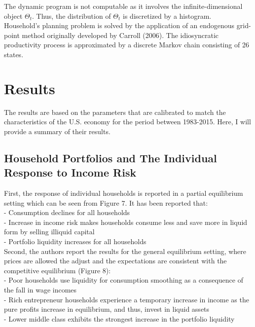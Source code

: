\documentclass[titlepage]{\econtex}
\begin{document}
The dynamic program is not computable as it involves the infinite-dimensional object $\Theta_{t}$. Thus, the distribution of $\Theta_{t}$ is discretized by a histogram.\\
Household's planning problem is solved by the application of an endogenous grid-point method originally developed by Carroll (2006). The idiosyncratic productivity process is approximated by a discrete Markov chain consisting of 26 states.\\

\hypertarget{Results}{}
\section{Results}

The results are based on the parameters that are calibrated to match the characteristics of the U.S. economy for the period between 1983-2015. Here, I will provide a summary of their results.

\hypertarget{Household Portfolios and The Individual Response to Income Risk}{}
\subsection{Household Portfolios and The Individual Response to Income Risk}

First, the response of individual households is reported in a partial equilibrium setting which can be seen from Figure 7. It has been reported that:\\
- Consumption declines for all households\\
- Increase in income risk makes households consume less and save more in liquid form by selling illiquid capital\\
- Portfolio liquidity increases for all households\\
Second, the authors report the results for the general equilibrium setting, where prices are allowed the adjust and the expectations are consistent with the competitive equilibrium (Figure 8):\\
- Poor households use liquidity for consumption smoothing as a consequence of the fall in wage incomes\\
- Rich entrepreneur households experience a temporary increase in income as the pure profits increase in equilibrium, and thus, invest in liquid assets\\
- Lower middle class exhibits the strongest increase in the portfolio liquidity
\end{document}

